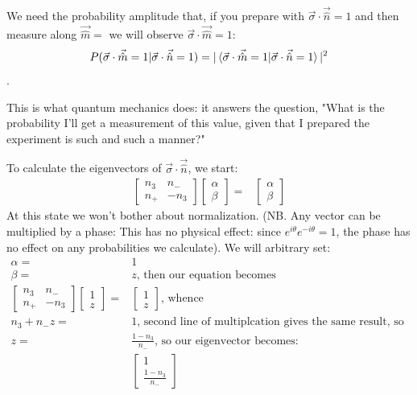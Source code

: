 \documentclass[]{article}
\begin{document}
We need the probability amplitude that, if you prepare with $\vec{\sigma} \cdot \vec{\hat{n}}=1$ and then measure along $\vec{\hat{m}}=$ we will observe $\vec{\sigma} \cdot \vec{\hat{m}}=1$:
$$P(\vec{\sigma} \cdot \vec{\hat{m}}=1\vert\vec{\sigma} \cdot \vec{\hat{n}}=1) = \vert \braket{\vec{\sigma} \cdot \vec{\hat{m}}=1\vert\vec{\sigma} \cdot \vec{\hat{n}}=1}\vert^2$$.

This is what quantum mechanics does: it answers the question, "What is the probability I'll get a measurement of this value, given that I prepared the experiment is such and such a manner?"

To calculate the eigenvectors of $\vec{\sigma} \cdot \vec{\hat{n}}$, we start:
\begin{align*}
	\begin{bmatrix}
		n_3 &n_-\\
		n_+&-n_3
	\end{bmatrix}\begin{bmatrix}
		\alpha\\
		\beta
	\end{bmatrix}=&\begin{bmatrix}
		\alpha\\
		\beta
	\end{bmatrix}
\end{align*}
At this state we won't bother about normalization. (NB. Any vector can be multiplied by a phase: This has no physical effect: since $e^{i\theta}e^{-i\theta}=1$, the phase has no effect on any probabilities we calculate). We will arbitrary set: 
\begin{align*}
	\alpha=&1\\
	\beta=&z \text{, then our equation becomes}\\
	\begin{bmatrix}
		n_3 &n_-\\
		n_+&-n_3
	\end{bmatrix}\begin{bmatrix}
		1\\
		z
	\end{bmatrix}=&\begin{bmatrix}
		1\\
		z
	\end{bmatrix} \text{, whence}\\
	n_3 + n_- z =& 1 \text{, second line of multiplcation gives the same result, so we'll ignore.}\\
	z =& \frac{1-n_3}{n_-} \text{, so our eigenvector becomes:}\\
	&\begin{bmatrix}
		1\\
		\frac{1-n_3}{n_-} 
	\end{bmatrix}
\end{align*}
\end{document}

